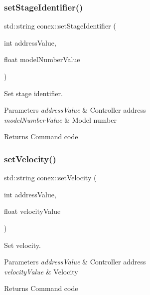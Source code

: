 \subsubsection{\texorpdfstring{set\+Stage\+Identifier()}{setStageIdentifier()}}
{\footnotesize\ttfamily std\+::string conex\+::set\+Stage\+Identifier (\begin{DoxyParamCaption}\item[{int}]{address\+Value,  }\item[{float}]{model\+Number\+Value }\end{DoxyParamCaption})}



Set stage identifier. 


\begin{DoxyParams}{Parameters}
{\em address\+Value} & Controller address \\
\hline
{\em model\+Number\+Value} & Model number \\
\hline
\end{DoxyParams}
\begin{DoxyReturn}{Returns}
Command code 
\end{DoxyReturn}
\mbox{\label{namespaceconex_aa970ffa1a5a264c97b5e821e1dedf0f0}} 
\subsubsection{\texorpdfstring{set\+Velocity()}{setVelocity()}}
{\footnotesize\ttfamily std\+::string conex\+::set\+Velocity (\begin{DoxyParamCaption}\item[{int}]{address\+Value,  }\item[{float}]{velocity\+Value }\end{DoxyParamCaption})}



Set velocity. 


\begin{DoxyParams}{Parameters}
{\em address\+Value} & Controller address \\
\hline
{\em velocity\+Value} & Velocity \\
\hline
\end{DoxyParams}
\begin{DoxyReturn}{Returns}
Command code 
\end{DoxyReturn}
\mbox{\label{namespaceconex_a5bcb38c3b971ccf0f2c03794ae16798c}} 

